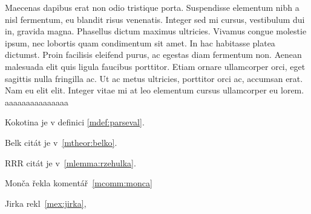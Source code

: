 Maecenas dapibus erat non odio tristique porta. Suspendisse elementum nibh a nisl fermentum, eu blandit risus venenatis. Integer sed mi cursus, vestibulum dui in, gravida magna. Phasellus dictum maximus ultricies. Vivamus congue molestie ipsum, nec lobortis quam condimentum sit amet. In hac habitasse platea dictumst. Proin facilisis eleifend purus, ac egestas diam fermentum non. Aenean malesuada elit quis ligula faucibus porttitor. Etiam ornare ullamcorper orci, eget sagittis nulla fringilla ac. Ut ac metus ultricies, porttitor orci ac, accumsan erat. Nam eu elit elit. Integer vitae mi at leo elementum cursus ullamcorper eu lorem. aaaaaaaaaaaaaaa


Kokotina je v definici \ref{mdef:parseval}.


Belk citát je v~\ref{mtheor:belko}.



RRR citát je v~\ref{mlemma:rzehulka}.

Monča řekla komentář~\ref{mcomm:monca}



Jirka rekl~\ref{mex:jirka},
